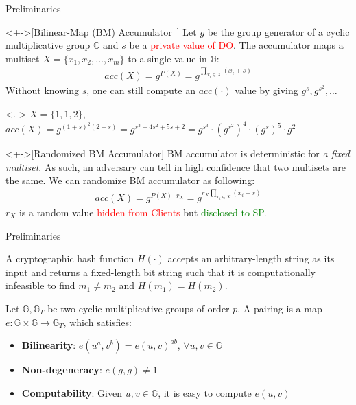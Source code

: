 \documentclass[xcolor={dvipsnames},aspectratio=169,10pt]{beamer}
\begin{document}
\begin{frame}{Preliminaries}
  \begin{definition}<+->[Bilinear-Map (BM) Accumulator~\cite{10.1007/978-3-540-30574-3_19}]
    Let $g$ be the group generator of a cyclic multiplicative group $\mathbb{G}$ and $s$ be a \textcolor{Red}{private value of DO}. The accumulator maps a multiset $X = \{ x_1, x_2, \dotsc, x_m \}$ to a single value in $\mathbb{G}$:
    \begin{align*}
      acc(X) = g^{P(X)} = g^{\prod_{x_i \in X}(x_i + s)}
    \end{align*}
    Without knowing $s$, one can still compute an $acc(\cdot)$ value by giving $g^s, g^{s^2}, \dotsc$
  \end{definition}
  \begin{example}<.->
    $X = \{ 1, 1, 2 \}$, $acc(X) = g^{{(1+s)}^2(2+s)} = g^{s^3+4 s^2+5 s+2} = g^{s^3} \cdot {(g^{s^2})}^4 \cdot {(g^s)}^5 \cdot g^2$
  \end{example}
  \begin{definition}<+->[Randomized BM Accumulator]
    BM accumulator is \alert{deterministic} for \emph{a fixed multiset}. As such, an adversary can tell in high confidence that two multisets are the same. We can randomize BM accumulator as following:
    \begin{align*}
      acc(X) = g^{P(X) \cdot r_X} = g^{r_X\prod_{x_i \in X}(x_i + s)}
    \end{align*}
    $r_X$ is a random value \textcolor{Red}{hidden from Clients} but \textcolor{Green}{disclosed to SP}.
  \end{definition}
\end{frame}

\begin{frame}{Preliminaries}
  \begin{definition}
    A cryptographic hash function $H(\cdot)$ accepts an arbitrary-length string as its input and returns a fixed-length bit string such that it is computationally infeasible to find $m_1 \neq m_2$ and $H(m_1) = H(m_2)$.
  \end{definition}
  \begin{definition}
    Let $\mathbb{G}, \mathbb{G}_T$ be two cyclic multiplicative groups of order $p$.
    A pairing is a map $e: \mathbb{G} \times \mathbb{G} \to \mathbb{G}_T$, which satisfies:
    \begin{itemize}
      \item \textbf{Bilinearity}: $e(u^a,v^b) = {e(u,v)}^{ab}$, $\forall u, v \in \mathbb{G}$
      \item \textbf{Non-degeneracy}: $e(g,g) \ne 1$
      \item \textbf{Computability}: Given $u, v \in \mathbb{G}$, it is easy to compute $e(u, v)$
    \end{itemize}
  \end{definition}
\end{frame}
\end{document}
